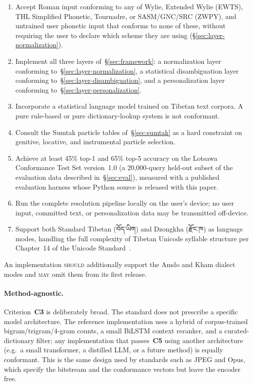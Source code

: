 \documentclass[11pt]{article}
\newcommand{\tib}[1]{{\fontspec{Jomolhari}#1}}
\begin{document}
\begin{enumerate}
\item[\textbf{C1}] Accept Roman input conforming to any of Wylie, Extended Wylie (EWTS), THL Simplified Phonetic, Tournadre, or SASM/GNC/SRC (ZWPY), and untrained user phonetic input that conforms to none of these, without requiring the user to declare which scheme they are using (\S\ref{sec:layer-normalization}).
\item[\textbf{C2}] Implement all three layers of~\S\ref{sec:framework}: a normalization layer conforming to~\S\ref{sec:layer-normalization}, a statistical disambiguation layer conforming to~\S\ref{sec:layer-disambiguation}, and a personalization layer conforming to~\S\ref{sec:layer-personalization}.
\item[\textbf{C3}] Incorporate a statistical language model trained on Tibetan text corpora. A pure rule-based or pure dictionary-lookup system is not conformant.
\item[\textbf{C4}] Consult the Sumtak particle tables of~\S\ref{sec:sumtak} as a hard constraint on genitive, locative, and instrumental particle selection.
\item[\textbf{C5}] Achieve at least 45\% top-1 and 65\% top-5 accuracy on the Lotsawa Conformance Test Set version~1.0 (a 20{,}000-query held-out subset of the evaluation data described in~\S\ref{sec:eval}), measured with a published evaluation harness whose Python source is released with this paper.
\item[\textbf{C6}] Run the complete resolution pipeline locally on the user's device; no user input, committed text, or personalization data may be transmitted off-device.
\item[\textbf{C7}] Support both Standard Tibetan (\tib{བོད་ཡིག}) and Dzongkha (\tib{རྫོང་ཁ}) as language modes, handling the full complexity of Tibetan Unicode syllable structure per Chapter~14 of the Unicode Standard~\cite{unicode14}.
\end{enumerate}

An implementation \textsc{should} additionally support the Amdo and Kham dialect modes and \textsc{may} omit them from its first release.

\paragraph{Method-agnostic.} Criterion~\textbf{C3} is deliberately broad. The standard does not prescribe a specific model architecture. The reference implementation uses a hybrid of corpus-trained bigram/trigram/4-gram counts, a small BiLSTM context reranker, and a curated-dictionary filter; any implementation that passes~\textbf{C5} using another architecture (e.g.\ a small transformer, a distilled LLM, or a future method) is equally conformant. This is the same design used by standards such as JPEG and Opus, which specify the bitstream and the conformance vectors but leave the encoder free.
\end{document}
